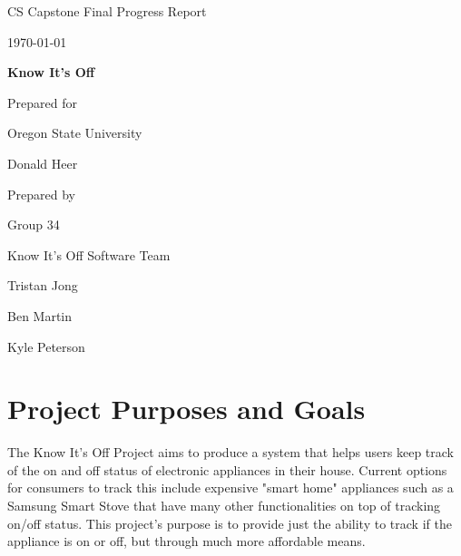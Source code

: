 \documentclass[onecolumn, draftclsnofoot,10pt, compsoc]{IEEEtran}
\def \CapstoneTeamName{		Know It's Off Software Team}
\def \CapstoneTeamNumber{		34}
\def \GroupMemberOne{			Tristan Jong}
\def \GroupMemberTwo{			Ben Martin}
\def \GroupMemberThree{			Kyle Peterson}
\def \CapstoneProjectName{	    Know It's Off}
\def \CapstoneSponsorCompany{	Oregon State University}
\def \CapstoneSponsorPerson{		Donald Heer}
\def \DocType{		%
				Final Progress Report
				}
\newcommand{\NameSigPair}[1]{\par
\makebox[2.75in][r]{#1} \hfil 	\makebox[3.25in]{\makebox[2.25in]{\hrulefill} \hfill		\makebox[.75in]{\hrulefill}}
\par\vspace{-12pt} \textit{\tiny\noindent
\makebox[2.75in]{} \hfil		\makebox[3.25in]{\makebox[2.25in][r]{Signature} \hfill	\makebox[.75in][r]{Date}}}}
\renewcommand{\NameSigPair}[1]{#1}
\begin{document}
\begin{titlepage}
    \begin{singlespace}
        \hfill 
        \par\vspace{.2in}
        \centering
        \scshape{
            \huge CS Capstone \DocType \par
            {\large\today}\par
            \vspace{.5in}
            \textbf{\Huge\CapstoneProjectName}\par
            \vfill
            {\large Prepared for}\par
            \Huge \CapstoneSponsorCompany\par
            \vspace{5pt}
            {\Large\NameSigPair{\CapstoneSponsorPerson}\par}
            {\large Prepared by }\par
            Group\CapstoneTeamNumber\par
            \CapstoneTeamName\par 
            \vspace{5pt}
            {\Large
                \NameSigPair{\GroupMemberOne}\par
                \NameSigPair{\GroupMemberTwo}\par
                \NameSigPair{\GroupMemberThree}\par
            }
            \vspace{20pt}
        }
        
    \end{singlespace}
\end{titlepage}
\newpage
{}
\tableofcontents
\clearpage

\section{Project Purposes and Goals}


\quad The Know It's Off Project aims to produce a system that helps users keep track of the on and off status of electronic appliances in their house. Current options for consumers to track this include expensive "smart home" appliances such as a Samsung Smart Stove that have many other functionalities on top of tracking on/off status. This project's purpose is to provide just the ability to track if the appliance is on or off, but through much more affordable means. 
\end{document}
